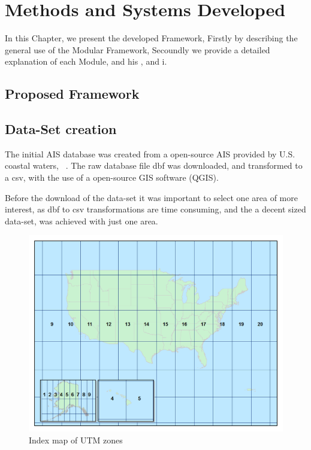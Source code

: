 \chapter{Methods and Systems Developed}
\label{chapter:Chapter 3}

In this Chapter, we present the developed Framework, Firstly by describing the general use of the Modular Framework, Secoundly we provide a detailed explanation of each Module, and his , and i.


\section{Proposed Framework}



\section{Data-Set creation} %




The initial AIS database was created from a open-source AIS provided by U.S. coastal waters, ~\cite{MarineCadastre}. The raw database file dbf was downloaded, and transformed to a csv, with the use of a open-source GIS software (QGIS). 
 
Before the download of the data-set it was important to select one area of more interest, as dbf to csv transformations are time consuming, and the a decent sized data-set, was achieved with just one area.

\begin{figure}[H]
	\centering
	\includegraphics[scale = .35]{figures/UTMZoneMap2014.png}
    \caption{Index map of UTM zones}
    \label{fig: UMT zones}
\end{figure}

